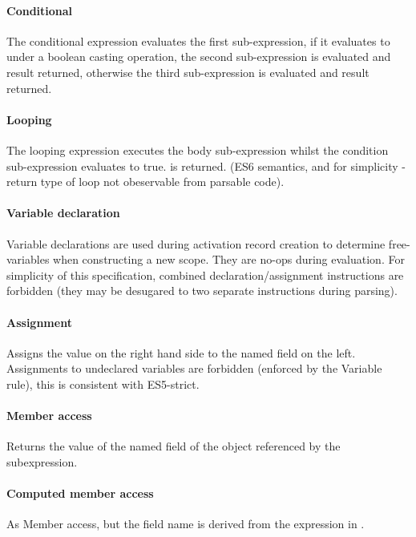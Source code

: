 \documentclass[a4paper]{article}
\begin{document}
\paragraph{Conditional} The conditional expression evaluates the first sub-expression, if it evaluates
to  under a boolean casting operation, the second sub-expression is
evaluated and result returned, otherwise the third sub-expression is evaluated
and result returned.

\paragraph{Looping} The looping expression executes the body sub-expression
whilst the condition sub-expression evaluates to true. \und is returned. (ES6
semantics, and for simplicity - return type of loop not obeservable from
parsable code).

\paragraph{Variable declaration} Variable declarations are used during activation
record creation to determine free-variables when constructing a new scope. They
are no-ops during evaluation. For simplicity of this specification, combined
declaration/assignment instructions are forbidden (they may be desugared to two
separate instructions during parsing).

\paragraph{Assignment} Assigns the value on the right hand side to the named
field on the left. Assignments to undeclared variables are forbidden (enforced
by the Variable rule), this is consistent with ES5-strict.

\paragraph{Member access} Returns the value of the named field of the object referenced by
the subexpression.

\paragraph{Computed member access} As Member access, but the field name is derived from
the expression in \js{[]}.
\end{document}
